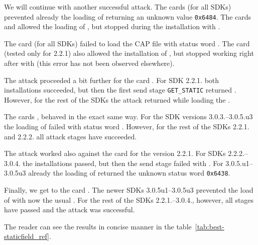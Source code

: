             We will continue with another successful attack. The cards \Gcard (for all SDKs) prevented already the loading of \vulnscap returning an unknown value \texttt{0x6484}. The cards \Icard and \Ccard allowed the loading of \vulnscap, but stopped during the installation with \shortswconditionsnotsatisfied.

            The card \Cnewcard (for all SDKs) failed to load the CAP file \appletscap with status word \shortswconditionsnotsatisfied. The card \Dcard (tested only for 2.2.1) also allowed the installation of \vulnscap, but stopped working right after with \scardwunresponsivecard (this error has not been observed elsewhere).

            The attack proceeded a bit further for the card \Inewcard. For SDK 2.2.1. both installations succeeded, but then the first send stage \texttt{GET_STATIC} returned \shortswunknown. However, for the rest of the SDKs the attack returned \shortswconditionsnotsatisfied while loading the \appletscap.

            The cards \Fcard, \Hcard behaved in the exact same way. For the SDK versions 3.0.3.--3.0.5.u3 the loading of \appletscap failed with status word \shortswwrongdata. However, for the rest of the SDKs 2.2.1. and 2.2.2. all attack stages have succeeded.

            The attack worked also against the card \Jcard for the version 2.2.1. For SDKs 2.2.2.--3.0.4. the installations passed, but then the send stage failed with \shortswinsnotsupported. For 3.0.5.u1--3.0.5u3 already the loading of \appletscap returned the unknown status word \texttt{0x6438}.

        Finally, we get to the card \Acard. The newer SDKs 3.0.5u1--3.0.5u3 prevented the load of \appletscap with now the usual \shortswwrongdata. For the rest of the SDKs 2.2.1.--3.0.4., however, all stages have passed and the attack was successful.

        The reader can see the results in concise manner in the table~\ref{tab:best-staticfield_ref}.




